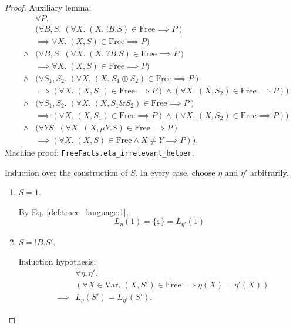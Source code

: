 \documentclass{llncs}
\newcommand*{\Var}{\mathrm{Var}}
\newcommand*{\Free}{\mathrm{Free}}
\newcommand*{\send}{\mathord{!}}
\newcommand*{\recv}{\mathord{?}}
\newcommand*{\echoice}{\oplus}
\newcommand*{\ichoice}{\mathop{\&}}
\renewcommand*{\|}{\;|\;}
\newcommand*{\machproofc}[1]{Machine proof: \code{#1}.}
\newcommand*{\code}[1]{\texttt{#1}}
\begin{document}
\begin{proof}
  Auxiliary lemma:
  \begin{eqnarray*}
    &&      \forall P. \\
    &&      (\forall B, S.\; (\forall X.\; (X.\; \send B.S) \in \Free \implies P) \\
    &&      \implies \forall X.\; (X, S) \in \Free \implies P) \\
    &\land& (\forall B, S.\; (\forall X.\; (X.\; \recv B.S) \in \Free \implies P) \\
    &&      \implies \forall X.\; (X, S) \in \Free \implies P) \\
    &\land& (\forall S_1, S_2.\; (\forall X.\; (X.\; S_1 \echoice S_2) \in \Free \implies P) \\
    &&      \implies (\forall X.\; (X, S_1) \in \Free \implies P) \land (\forall X.\; (X, S_2) \in \Free \implies P)) \\
    &\land& (\forall S_1, S_2.\; (\forall X.\; (X, S_1 \ichoice S_2) \in \Free \implies P) \\
    &&      \implies (\forall X.\; (X, S_1) \in \Free \implies P) \land (\forall X.\; (X, S_2) \in \Free \implies P)) \\
    &\land& (\forall Y S.\; (\forall X.\; (X, \mu Y.S) \in \Free \implies P) \\
    &&      \implies (\forall X.\; (X, S) \in \Free \land X \neq Y \implies P)).
  \end{eqnarray*}
  \machproofc{FreeFacts.eta\_irrelevant\_helper}

  \bigskip

  Induction over the construction of $S$. In every case, choose $\eta$ and
  $\eta'$ arbitrarily.

  \begin{enumerate}
    \item
      \label{case:eta_irrelevant1:1}
      $S = 1$.

      By Eq. \ref{def:trace_language:1},
      \begin{equation*}
        L_\eta(1) = \{\varepsilon\} = L_{\eta'}(1)
      \end{equation*}

    \item
      \label{case:eta_irrelevant1:send}
      $S = \send B.S'$.

      Induction hypothesis:
      \begin{eqnarray*}
        &&         \forall \eta, \eta'.\; \\
        &&         (\forall X \in \Var.\; (X, S') \in \Free \implies \eta(X) = \eta'(X)) \\
        &\implies& L_\eta(S') = L_{\eta'}(S').
      \end{eqnarray*}


\end{enumerate}
\end{proof}
\end{document}

